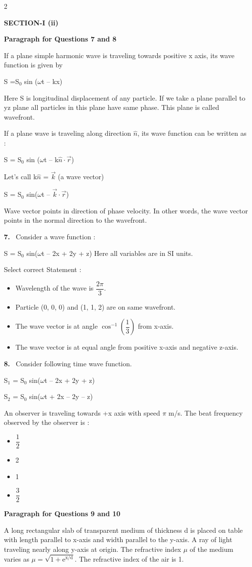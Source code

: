\documentclass[10pt]{extarticle}
\newcommand{\sect}[1]{\par\smallskip\noindent\textbf{#1}\par}
\newcommand{\qn}[1]{\par\smallskip\noindent\textbf{#1.}~}
\newcommand{\paraq}[2]{\par\smallskip\noindent\textbf{Paragraph for Questions #1 and #2}\par}
\newenvironment{qoptions}{\begin{itemize}[leftmargin=1.8em,itemsep=1pt,topsep=2pt,label={}]}{\end{itemize}}
\newcommand{\opt}[2]{\item[(#1)] #2}
\begin{document}
\begin{multicols}{2}
\sect{SECTION-I (ii)}
\paraq{7}{8}
If a plane simple harmonic wave is traveling towards positive x axis, its wave function is given by\par
S =S$_0$ sin ($\omega$t -- kx)\par
Here S is longitudinal displacement of any particle. If we take a plane parallel to yz plane all particles in this plane have same phase. This plane is called wavefront.\par
If a plane wave is traveling along direction $\hat{n}$, its wave function can be written as :\par
S = S$_0$ sin ($\omega$t -- k$\hat{n}\cdot\vec{r}$)\par
Let's call k$\hat{n}$ = $\vec{k}$ (a wave vector)\par
S = S$_0$ sin($\omega$t -- $\vec{k}\cdot\vec{r}$)\par
Wave vector points in direction of phase velocity. In other words, the wave vector points in the normal direction to the wavefront.\par
\qn{7} Consider a wave function :\par
S = S$_0$ sin($\omega$t -- 2x + 2y + z) Here all variables are in SI units.\par
Select correct Statement :
\begin{qoptions}
\opt{A}{Wavelength of the wave is $\dfrac{2\pi}{3}$.}
\opt{B}{Particle (0, 0, 0) and (1, 1, 2) are on same wavefront.}
\opt{C}{The wave vector is at angle $\cos^{-1}\!\left(\dfrac{1}{3}\right)$ from x-axis.}
\opt{D}{The wave vector is at equal angle from positive x-axis and negative z-axis.}
\end{qoptions}
\qn{8} Consider following time wave function.\par
S$_1$ = S$_0$ sin($\omega$t -- 2x + 2y + z)\par
S$_2$ = S$_0$ sin($\omega$t + 2x -- 2y -- z)\par
An observer is traveling towards +x axis with speed $\pi$ m/s. The beat frequency observed by the observer is :
\begin{qoptions}
\opt{A}{$\dfrac{1}{2}$}
\opt{B}{2}
\opt{C}{1}
\opt{D}{$\dfrac{3}{2}$}
\end{qoptions}
\paraq{9}{10}
A long rectangular slab of transparent medium of thickness d is placed on table with length parallel to x-axis and width parallel to the y-axis. A ray of light traveling nearly along y-axis at origin. The refractive index $\mu$ of the medium varies as $\mu = \sqrt{1+\text{e}^{\text{x/d}}}$. The refractive index of the air is 1.\par

\end{multicols}
\end{document}
